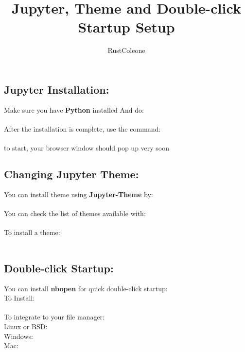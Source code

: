 \documentclass{article}
\author{RustColeone}
\title{Jupyter, Theme and Double-click Startup Setup}
\begin{document}
  \maketitle
  \subsection[]{Jupyter Installation:}
  
  Make sure you have \textbf{Python} installed And do:\\

  \indent{}\\

  After the installation is complete, use the command:\\

  \indent{}\\

  to start, your browser window should pop up very soon

  \subsection[]{Changing Jupyter Theme:}

  You can install theme using \textbf{Jupyter-Theme} by:\\

  \indent{}\\

  You can check the list of themes available with:\\

  \indent{}\\

  To install a theme:\\

  \indent{}\\

  \subsection[]{Double-click Startup:}

  You can install \textbf{nbopen} for quick double-click startup:\\

  To Install:\\

  \\

  To integrate to your file manager:\\

  Linux or BSD: \\

  Windows: \\

  Mac: \\
\end{document}
